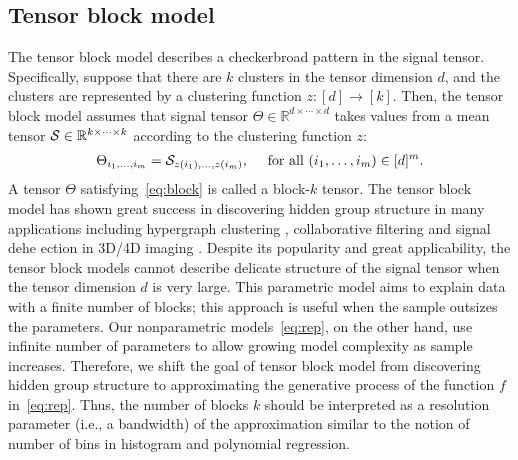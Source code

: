 \documentclass{article}
\theoremstyle{definition}
\begin{document}
\subsection{Tensor block model}
\vspace{-.2cm}
The tensor block model describes a checkerbroad pattern in the signal tensor. Specifically, suppose that there are $k$ clusters in the tensor dimension $d$, and the clusters are represented by a clustering function $z\colon [d]\rightarrow  [k]$. Then, the tensor block model assumes that signal tensor $\Theta\in\mathbb{R}^{d\times \cdots \times d}$ takes values from a mean tensor $\mathcal{S}\in\mathbb{R}^{k\times\cdots\times k}$ according to the clustering function $z$:
\begin{align}\label{eq:block}
    \Theta_{i_1,\ldots,i_m} = \mathcal{S}_{z(i_1),\ldots,z(i_m)}, \quad \text{ for all } (i_1,\ldots,i_m)\in[d]^m.
\end{align}
A tensor $\Theta$ satisfying~\eqref{eq:block} is called a block-$k$ tensor. The tensor block model has shown great success in discovering hidden group structure in many applications including hypergraph clustering \citep{ke2019community}, collaborative filtering \citep{zhang2021dynamic} and signal dehe ection in 3D/4D
imaging \citep{zhang2020denoising}.
Despite its popularity and great applicability, the tensor block models cannot describe delicate structure of the signal tensor when the tensor dimension $d$ is very large. 
This parametric model aims to explain data with a finite number of blocks; this approach is useful when the sample outsizes the parameters. Our nonparametric models~\eqref{eq:rep}, on the other hand, use infinite number of parameters to allow growing model complexity as sample increases. 
Therefore, we shift the goal of tensor block model from discovering hidden group structure to approximating the generative process of the function $f$ in~\eqref{eq:rep}. Thus, the number of blocks $k$ should be interpreted as a resolution parameter (i.e., a bandwidth) of the approximation similar to the notion of number of bins in histogram and polynomial regression. 
\vspace{-.2cm}
\end{document}
